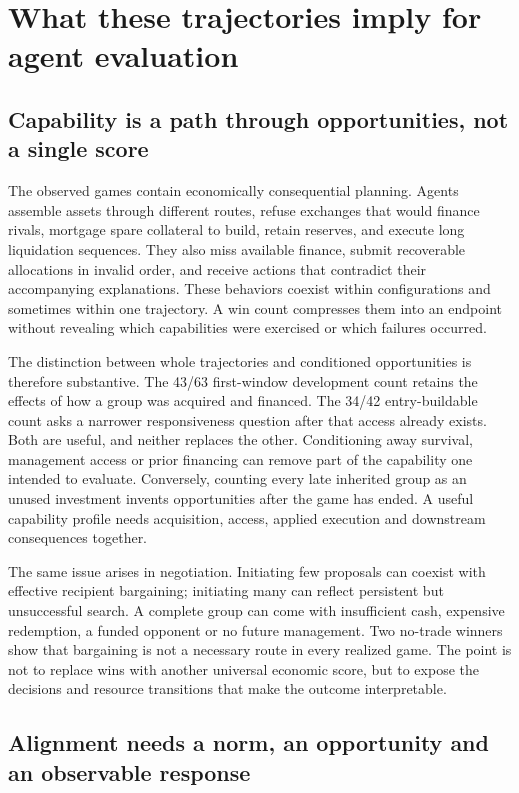 \section{What these trajectories imply for agent evaluation}
\label{sec:discussion}

\subsection{Capability is a path through opportunities, not a single score}

The observed games contain economically consequential planning. Agents assemble assets through different routes, refuse exchanges that would finance rivals, mortgage spare collateral to build, retain reserves, and execute long liquidation sequences. They also miss available finance, submit recoverable allocations in invalid order, and receive actions that contradict their accompanying explanations. These behaviors coexist within configurations and sometimes within one trajectory. A win count compresses them into an endpoint without revealing which capabilities were exercised or which failures occurred.

The distinction between whole trajectories and conditioned opportunities is therefore substantive. The 43/63 first-window development count retains the effects of how a group was acquired and financed. The 34/42 entry-buildable count asks a narrower responsiveness question after that access already exists. Both are useful, and neither replaces the other. Conditioning away survival, management access or prior financing can remove part of the capability one intended to evaluate. Conversely, counting every late inherited group as an unused investment invents opportunities after the game has ended. A useful capability profile needs acquisition, access, applied execution and downstream consequences together.

The same issue arises in negotiation. Initiating few proposals can coexist with effective recipient bargaining; initiating many can reflect persistent but unsuccessful search. A complete group can come with insufficient cash, expensive redemption, a funded opponent or no future management. Two no-trade winners show that bargaining is not a necessary route in every realized game. The point is not to replace wins with another universal economic score, but to expose the decisions and resource transitions that make the outcome interpretable.

\subsection{Alignment needs a norm, an opportunity and an observable response}

